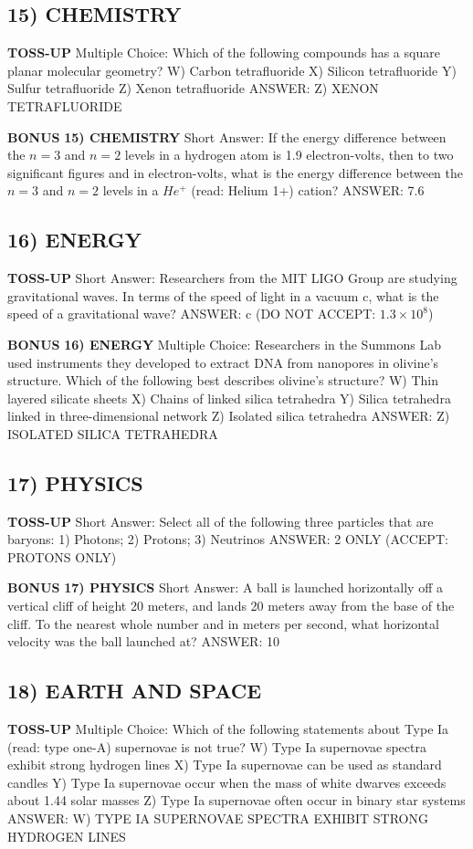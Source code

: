 \documentclass{article}
\begin{document}
\subsection*{15) CHEMISTRY}
\textbf{TOSS-UP}
Multiple Choice: Which of the following compounds has a square planar molecular geometry?
W) Carbon tetrafluoride
X) Silicon tetrafluoride
Y) Sulfur tetrafluoride
Z) Xenon tetrafluoride
ANSWER: Z) XENON TETRAFLUORIDE

\textbf{BONUS}
\textbf{15) CHEMISTRY}
Short Answer: If the energy difference between the $n=3$ and $n=2$ levels in a hydrogen atom is 1.9 electron-volts, then to two significant figures and in electron-volts, what is the energy difference between the $n=3$ and $n=2$ levels in a $He^{+}$ (read: Helium 1+) cation?
ANSWER: 7.6

\subsection*{16) ENERGY}
\textbf{TOSS-UP}
Short Answer: Researchers from the MIT LIGO Group are studying gravitational waves. In terms of the speed of light in a vacuum c, what is the speed of a gravitational wave?
ANSWER: c (DO NOT ACCEPT: $1.3 \times 10^{8}$)

\textbf{BONUS}
\textbf{16) ENERGY}
Multiple Choice: Researchers in the Summons Lab used instruments they developed to extract DNA from nanopores in olivine's structure. Which of the following best describes olivine's structure?
W) Thin layered silicate sheets
X) Chains of linked silica tetrahedra
Y) Silica tetrahedra linked in three-dimensional network
Z) Isolated silica tetrahedra
ANSWER: Z) ISOLATED SILICA TETRAHEDRA

\subsection*{17) PHYSICS}
\textbf{TOSS-UP}
Short Answer: Select all of the following three particles that are baryons: 1) Photons; 2) Protons; 3) Neutrinos
ANSWER: 2 ONLY (ACCEPT: PROTONS ONLY)

\textbf{BONUS}
\textbf{17) PHYSICS}
Short Answer: A ball is launched horizontally off a vertical cliff of height 20 meters, and lands 20 meters away from the base of the cliff. To the nearest whole number and in meters per second, what horizontal velocity was the ball launched at?
ANSWER: 10

\subsection*{18) EARTH AND SPACE}
\textbf{TOSS-UP}
Multiple Choice: Which of the following statements about Type Ia (read: type one-A) supernovae is not true?
W) Type Ia supernovae spectra exhibit strong hydrogen lines
X) Type Ia supernovae can be used as standard candles
Y) Type Ia supernovae occur when the mass of white dwarves exceeds about 1.44 solar masses
Z) Type Ia supernovae often occur in binary star systems
ANSWER: W) TYPE IA SUPERNOVAE SPECTRA EXHIBIT STRONG HYDROGEN LINES
\end{document}
